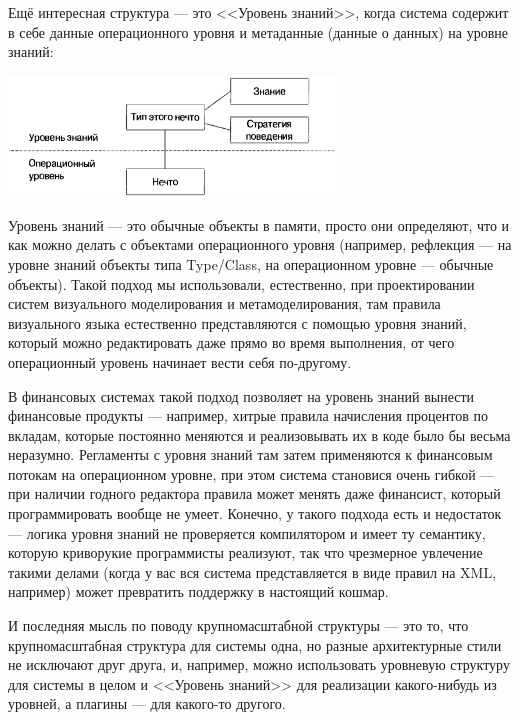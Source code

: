 \documentclass{../../text-style}
\begin{document}
Ещё интересная структура --- это <<Уровень знаний>>, когда система содержит в себе данные операционного уровня и метаданные (данные о данных) на уровне знаний:

\begin{center}
    \includegraphics[width=0.65\textwidth]{knowledgeLevel.png}
\end{center}

Уровень знаний --- это обычные объекты в памяти, просто они определяют, что и как можно делать с объектами операционного уровня (например, рефлекция --- на уровне знаний объекты типа Type/Class, на операционном уровне --- обычные объекты). Такой подход мы использовали, естественно, при проектировании систем визуального моделирования и метамоделирования, там правила визуального языка естественно представляются с помощью уровня знаний, который можно редактировать даже прямо во время выполнения, от чего операционный уровень начинает вести себя по-другому. 

В финансовых системах такой подход позволяет на уровень знаний вынести финансовые продукты --- например, хитрые правила начисления процентов по вкладам, которые постоянно меняются и реализовывать их в коде было бы весьма неразумно. Регламенты с уровня знаний там затем применяются к финансовым потокам на операционном уровне, при этом система становися очень гибкой --- при наличии годного редактора правила может менять даже финансист, который программировать вообще не умеет. Конечно, у такого подхода есть и недостаток --- логика уровня знаний не проверяется компилятором и имеет ту семантику, которую криворукие программисты реализуют, так что чрезмерное увлечение такими делами (когда у вас вся система представляется в виде правил на XML, например) может превратить поддержку в настоящий кошмар.

И последняя мысль по поводу крупномасштабной структуры --- это то, что крупномасштабная структура для системы одна, но разные архитектурные стили не исключают друг друга, и, например, можно использовать уровневую структуру для системы в целом и <<Уровень знаний>> для реализации какого-нибудь из уровней, а плагины --- для какого-то другого.
\end{document}
